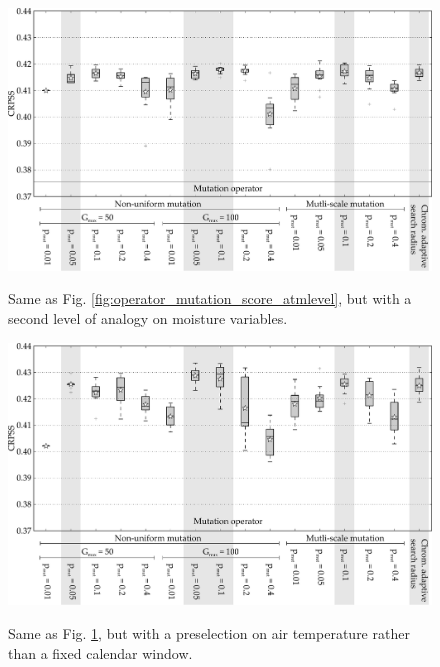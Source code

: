 \documentclass{ametsoc}
\begin{document}
\begin{figure}[t]
	\begin{center}
		\noindent\includegraphics[width=33pc,angle=0]{fig09.pdf}\\
	\end{center}
	\caption{Same as Fig. \ref{fig:operator_mutation_score_atmlevel}, but with a second level of analogy on moisture variables.}
	\label{fig:operator_mutation_score_r2}
\end{figure}

\begin{figure}[t]
	\begin{center}
		\noindent\includegraphics[width=33pc,angle=0]{fig10.pdf}\\
	\end{center}
	\caption{Same as Fig. \ref{fig:operator_mutation_score_r2}, but with a preselection on air temperature rather than a fixed calendar window.}
	\label{fig:operator_mutation_score_r4}
\end{figure}
\end{document}
